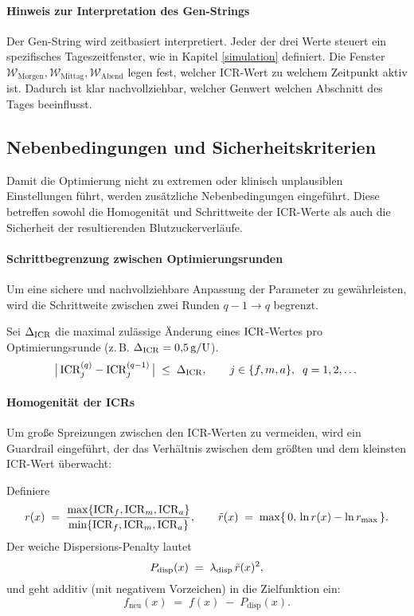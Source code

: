 \paragraph{Hinweis zur Interpretation des Gen-Strings}
\noindent Der Gen-String wird zeitbasiert interpretiert. Jeder der drei Werte steuert ein spezifisches Tageszeitfenster, wie in Kapitel \ref{simulation} definiert. Die Fenster \(\mathcal W_{\mathrm{Morgen}}, \mathcal W_{\mathrm{Mittag}}, \mathcal W_{\mathrm{Abend}}\) legen fest, welcher ICR-Wert zu welchem Zeitpunkt aktiv ist. Dadurch ist klar nachvollziehbar, welcher Genwert welchen Abschnitt des Tages beeinflusst.

\subsection{Nebenbedingungen und Sicherheitskriterien}

Damit die Optimierung nicht zu extremen oder klinisch unplausiblen Einstellungen führt, werden zusätzliche Nebenbedingungen eingeführt. Diese betreffen sowohl die Homogenität und Schrittweite der ICR-Werte als auch die Sicherheit der resultierenden Blutzuckerverläufe. \\

\paragraph{Schrittbegrenzung zwischen Optimierungsrunden}

Um eine sichere und nachvollziehbare Anpassung der Parameter zu gewährleisten, wird die Schrittweite zwischen zwei Runden \(q-1 \to q\) begrenzt.

\noindent Sei \(\Delta_{\mathrm{ICR}}\) die maximal zulässige Änderung eines \(\mathrm{ICR}\)-Wertes pro Optimierungsrunde (z.\,B. \(\Delta_{\mathrm{ICR}}=0{,}5\,\mathrm{g}/\mathrm{U}\)). 
\[
\bigl|\,\mathrm{ICR}_j^{(q)} - \mathrm{ICR}_j^{(q-1)}\,\bigr| \;\le\; \Delta_{\mathrm{ICR}},
\qquad j \in \{f,m,a\},\;\; q=1,2,\dots
\]

\medskip
\paragraph{Homogenität der ICRs}
Um große Spreizungen zwischen den ICR-Werten zu vermeiden, wird ein Guardrail eingeführt, der das Verhältnis zwischen dem größten und dem kleinsten ICR-Wert überwacht:

\noindent Definiere
\[
r(x)\;=\;\frac{\max\{\mathrm{ICR}_f,\mathrm{ICR}_m,\mathrm{ICR}_a\}}{\min\{\mathrm{ICR}_f,\mathrm{ICR}_m,\mathrm{ICR}_a\}},
\qquad
\tilde r(x)\;=\;\max\{\,0,\,\ln r(x)-\ln r_{\max}\,\}.
\]
Der weiche Dispersions-Penalty lautet
\[
P_{\mathrm{disp}}(x)\;=\;\lambda_{\mathrm{disp}}\,\tilde r(x)^{2},
\]
und geht additiv (mit negativem Vorzeichen) in die Zielfunktion ein:
\[
f_{\text{neu}}(x)\;=\;f(x)\;-\;P_{\mathrm{disp}}(x).
\]

